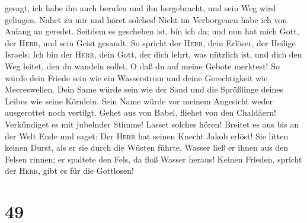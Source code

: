 gesagt, ich habe ihn auch berufen und ihn hergebracht, und sein Weg wird
gelingen.  Nahet zu mir und höret solches! Nicht im
Verborgenen habe ich von Anfang an geredet. Seitdem es geschehen ist,
bin ich da; und nun hat mich Gott, der \textsc{Herr}, und sein Geist
gesandt.  So spricht der \textsc{Herr}, dein Erlöser, der
Heilige Israels: Ich bin der \textsc{Herr}, dein Gott, der dich lehrt,
was nützlich ist, und dich den Weg leitet, den du wandeln sollst.
 O daß du auf meine Gebote merktest! So würde dein Friede
sein wie ein Wasserstrom und deine Gerechtigkeit wie Meereswellen.
 Dein Same würde sein wie der Sand und die Sprößlinge
deines Leibes wie seine Körnlein. Sein Name würde vor meinem Angesicht
weder ausgerottet noch vertilgt.  Gehet aus von Babel,
fliehet von den Chaldäern! Verkündiget es mit jubelnder Stimme! Lasset
solches hören! Breitet es aus bis an der Welt Ende und saget: Der
\textsc{Herr} hat seinen Knecht Jakob erlöst!  Sie litten
keinen Durst, als er sie durch die Wüsten führte, Wasser ließ er ihnen
aus den Felsen rinnen; er spaltete den Fels, da floß Wasser heraus!
 Keinen Frieden, spricht der \textsc{Herr}, gibt es für
die Gottlosen!

\hypertarget{section-48}{%
\section{49}\label{section-48}}

